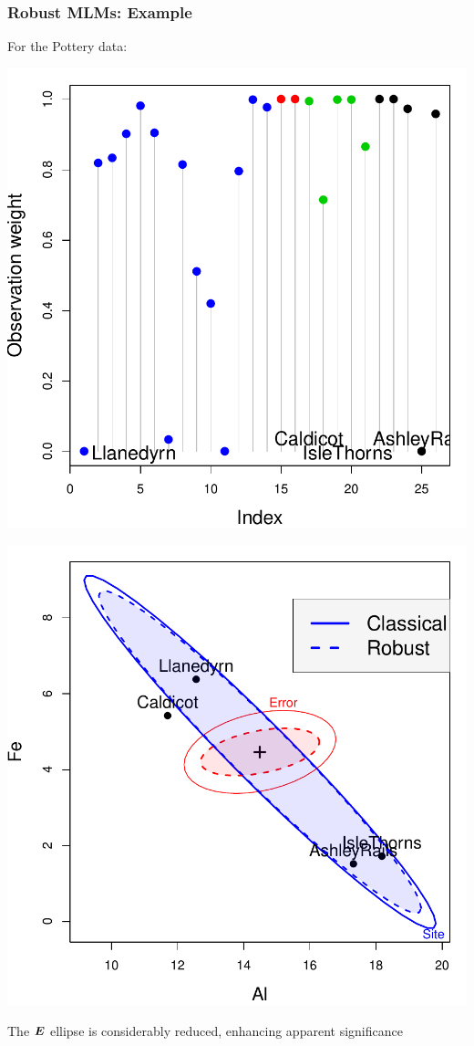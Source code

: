 \begin{frame}
  \frametitle{Robust MLMs: Example}
  For the Pottery data:

  \begin{minipage}[c]{.5\textwidth}
   \includegraphics[width=1\linewidth,clip]{figures/pottery-weights}
   \end{minipage}%
  \hfill
  \begin{minipage}[c]{.5\textwidth}
   \includegraphics[width=1\linewidth,clip]{figures/pottery-robust}
  \end{minipage}

The $\bm{E}$ ellipse is considerably reduced, enhancing apparent significance 
\end{frame}
